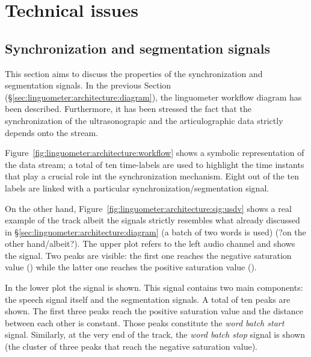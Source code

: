 \section{Technical issues}
\label{ch:linguometer:technical}


\subsection{Synchronization and segmentation signals}
\label{sec:linguometer:technical:signals}
This section aims to discuss the properties of the synchronization and
segmentation signals. 
In the previous Section (\S\ref{sec:linguometer:architecture:diagram}), the
linguometer workflow diagram has been described. 
Furthermore, it has been stressed the fact that the synchronization of the 
ultrasonograpic and the articulographic data strictly depends onto the 
 stream.

Figure~\ref{fig:linguometer:architecture:workflow} shows a symbolic
representation of the data  stream; 
a total of ten time-labels are used to highlight the time instants that play a
crucial role int the synchronization mechanism. 
Eight out of the ten labels are linked with a particular
synchronization/segmentation signal.

On the other hand, Figure~\ref{fig:linguometer:architecture:sig:usdv} shows a 
real example of the  track albeit the signals strictly 
resembles what already
discussed in \S\ref{sec:linguometer:architecture:diagram} (a batch of two words
is used) (?on the other hand/albeit?).
The upper plot refers to the left audio channel and shows the 
signal. Two peaks are visible: the first one reaches the negative saturation
value () while the latter one reaches the positive saturation value 
().

In the lower plot the  signal is shown. This signal contains two
  main components: the speech signal itself and the segmentation signals.
A total of ten peaks are shown.
The first three peaks reach the positive saturation value and the distance
between each other is constant. 
Those peaks constitute the \emph{word batch start} signal.
Similarly, at the very end of the track, the \emph{word batch stop} signal is
shown (the cluster of three peaks that reach the negative saturation value).


